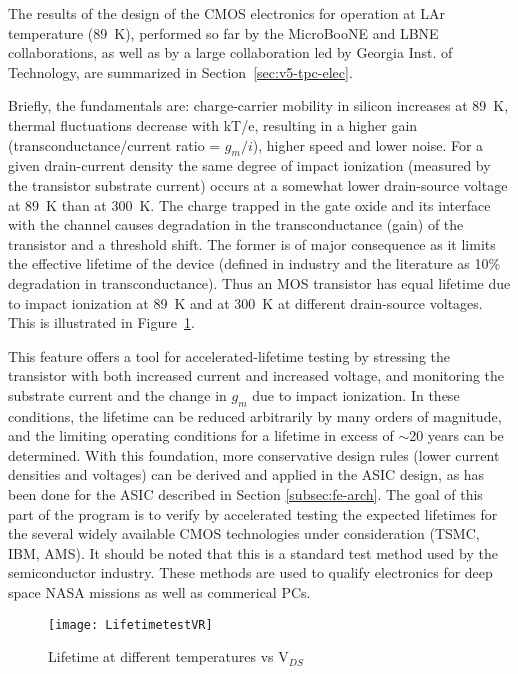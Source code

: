 The results of the design of the CMOS electronics for operation at LAr temperature (89~K), performed so far by the MicroBooNE and LBNE collaborations, as well as by a large collaboration led by Georgia Inst. of Technology, are summarized in Section~\ref{sec:v5-tpc-elec}.

Briefly, the fundamentals are: charge-carrier mobility in silicon increases at 89~K, thermal fluctuations decrease with kT/e, resulting in a higher gain (transconductance/current ratio =
 $g_{m}/ i$), higher speed and lower noise. For a given drain-current density the same degree of impact ionization (measured by the transistor substrate current) occurs at a somewhat lower drain-source voltage at 89~K than at 300~K. The charge trapped in the gate oxide and its interface with the channel causes degradation in the transconductance (gain) of the transistor and a threshold shift. The former is of major consequence as it limits the effective lifetime of the device (defined in industry and the literature as 10\% degradation in transconductance). Thus an MOS transistor has equal lifetime due to impact ionization at 89~K and at 300~K at different drain-source voltages. This is illustrated in Figure~\ref{DSV}.  

This feature offers a tool for accelerated-lifetime testing by stressing the transistor with both increased current and increased voltage, and monitoring the substrate current and the change  in $g_{m}$ due to impact ionization. In these conditions, the lifetime can be reduced arbitrarily by many orders of magnitude, and the limiting operating conditions for a lifetime in excess of $\sim$20 years can be determined. With this foundation, more conservative design rules (lower current densities and voltages) can be derived and applied in the ASIC design, as has been done for the ASIC described in Section \ref{subsec:fe-arch}. The goal of this part of the program is to verify by accelerated testing the expected lifetimes for the several widely available CMOS technologies under consideration (TSMC, IBM, AMS). It should be noted that this is a standard test method used by the semiconductor industry. These methods are used to qualify electronics for deep space NASA missions as well as commerical PCs.
 
\begin{figure}
\centering 
{\texttt{[image: LifetimetestVR]}}
\caption{Lifetime at different temperatures vs V$_{DS}$}
\label{DSV}
\end{figure}

